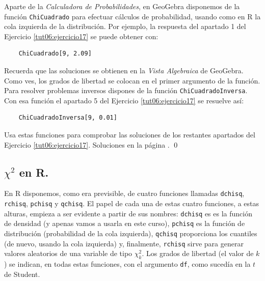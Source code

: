\documentclass[10pt,a4paper]{article}\usepackage[]{graphicx}\usepackage[]{color}
\begin{document}
Aparte de la {\em Calculadora de Probabilidades}, en GeoGebra disponemos de la función {\tt ChiCuadrado} para efectuar cálculos de probabilidad, usando como en R la cola izquierda de la distribución. Por ejemplo, la respuesta del apartado 1 del Ejercicio \ref{tut06:ejercicio17} se puede obtener con:
\begin{verbatim}
    ChiCuadrado[9, 2.09]
\end{verbatim}
Recuerda que las soluciones se obtienen en la {\em Vista Algebraica} de GeoGebra. Como ves, los grados de libertad se colocan en el primer argumento de la función.  Para resolver problemas inversos dispones de la función {\tt ChiCuadradoInversa}. Con esa función el apartado 5 del Ejercicio \ref{tut06:ejercicio17} se resuelve así:
\begin{verbatim}
    ChiCuadradoInversa[9, 0.01]
\end{verbatim}

\begin{ejercicio}
\label{tut06:ejercicio18}
Usa estas funciones para comprobar las soluciones de los restantes apartados del Ejercicio \ref{tut06:ejercicio17}.
Soluciones en la página \pageref{tut06:ejercicio18:sol}.
\qed
\end{ejercicio}

\subsection{$\chi^2$ en R.}
\label{tut06:subsec:Chi2EnR}

En R disponemos, como era previsible, de cuatro funciones llamadas  {\tt dchisq}, {\tt rchisq}, {\tt pchisq} y {\tt qchisq}. El papel de cada una de estas cuatro funciones, a estas alturas, empieza a ser evidente a partir de sus nombres: {\tt dchisq} es es la función de densidad (y apenas vamos a usarla en este curso), {\tt pchisq} es la función de distribución (probabilidad de la cola izquierda), {\tt qchisq} proporciona los cuantiles (de nuevo, usando la cola izquierda) y, finalmente, {\tt rchisq} sirve para generar valores aleatorios de una variable de tipo $\chi^2_k$.  Los grados de libertad (el valor de $k$) se indican, en todas estas funciones, con el argumento {\tt df}, como sucedía en la $t$ de Student.
\end{document}
